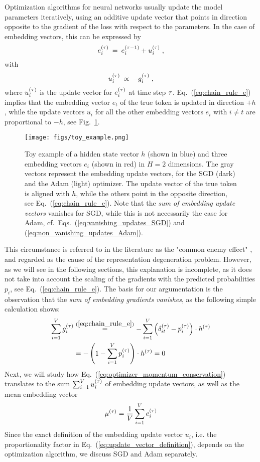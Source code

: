Optimization algorithms for neural networks usually update the model parameters iteratively, using an additive update vector that points in direction opposite to the gradient of the loss with respect to the parameters. In the case of embedding vectors, this can be expressed by
\begin{equation}
e_i^{(\tau)} \: = \: e_i^{(\tau-1)} + u_i^{(\tau)}  \; ,
\label{eq:update_general}
\end{equation}
with
\begin{equation}
u_i^{(\tau)} \: \propto \: - g_i^{(\tau)} \; ,
\label{eq:update_vector_definition}
\end{equation}
where $u_i^{(\tau)}$ is the update vector for $e_i^{(\tau)}$ at time step $\tau$.
Eq.~(\ref{eq:chain_rule_e}) implies that the embedding vector $e_t$ of the true token is updated in direction $+h$, while the update vectors $u_i$ for all the other embedding vectors $e_i$ with $i \neq t$ are proportional to $-h$, see Fig.~\ref{fig:gradients_example}. 
\begin{figure}[t]
\centering
\texttt{[image: figs/toy\_example.png]}
\caption{Toy example of a hidden state vector $h$ (shown in blue) and three embedding vectors $e_i$ (shown in red) in $H = 2$ dimensions. The gray vectors represent the embedding update vectors, for the SGD (dark) and the Adam (light) optimizer. The update vector of the true token is aligned with $h$, while the others point in the opposite direction, see Eq.~(\ref{eq:chain_rule_e}). Note that the {\em sum of embedding update vectors} vanishes for SGD, while this is not necessarily the case for Adam, cf.~Eqs.~(\ref{eq:vanishing_updates_SGD}) and (\ref{eq:non_vanishing_updates_Adam}).}
\label{fig:gradients_example}
\end{figure}
This circumstance is referred to in the literature as the "common enemy effect" \cite{bis2021tmic}, and regarded as the cause of the representation degeneration problem. 
However, as we will see in the following sections, this explanation is incomplete, as it does not take into account the scaling of the gradients with the predicted probabilities $p_i$, see Eq.~(\ref{eq:chain_rule_e}). The basis for our argumentation is the observation that the {\em sum of embedding gradients vanishes}, as the following simple calculation shows:
\begin{align}
\sum_{i=1}^V g_i^{(\tau)} 
&\stackrel{(\ref{eq:chain_rule_e})}{=} 
- \sum_{i=1}^V  \left( \delta_{it}^{(\tau)} - p_i^{(\tau)} \right) \cdot h^{(\tau)} \nonumber \\
&= - \left( 1 - \sum_{i=1}^V p_i^{(\tau)} \right) \cdot h^{(\tau)} = 0 
\label{eq:optimizer_momentum_conservation}
\end{align}
Next, we will study how Eq.~(\ref{eq:optimizer_momentum_conservation}) translates to the sum $\sum_{i=1}^V u_i^{(\tau)}$
of embedding update vectors, as well as the mean embedding vector
\begin{equation}
\mu^{(\tau)} = \frac{1}{V} \sum_{i=1}^V e_i^{(\tau)}
\label{eq:mu}
\end{equation}
Since the exact definition of the embedding update vector $u_i$, i.e. the proportionality factor in Eq.~(\ref{eq:update_vector_definition}), depends on the optimization algorithm, we discuss SGD and Adam separately.

